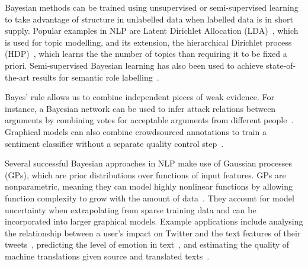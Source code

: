 Bayesian methods can be trained using unsupervised or semi-supervised learning
to take advantage of structure in unlabelled data when labelled data is in short supply.
Popular examples in NLP are
Latent Dirichlet Allocation (LDA)~\cite{blei2003latent}, which is used for topic modelling,
and its extension, the hierarchical Dirichlet process (HDP)~\cite{teh2005sharing}, which learns the 
the number of topics than requiring it to be fixed a priori.
Semi-supervised Bayesian learning
has also been used to achieve state-of-the-art results for semantic role labelling~\cite{titov2012bayesian}.

Bayes' rule allows us to combine independent pieces of weak evidence.
For instance, a Bayesian network can be used to infer attack relations between arguments by combining votes for acceptable arguments from different people~\cite{kido2017}.
Graphical models can also combine crowdsourced annotations to train a sentiment classifier
without a separate quality control step~\cite{simpson2015language,felt2016semantic}.

Several successful Bayesian approaches in NLP make use of Gaussian processes (GPs), which are 
prior distributions over functions of input features. 
GPs are nonparametric, meaning they can model highly nonlinear functions by
allowing function complexity to grow with the amount of data~\cite{rasmussen_gaussian_2006}.
They account for model uncertainty when extrapolating from sparse training data
and can be incorporated into larger graphical models.
Example applications include analysing the relationship between a user's impact on Twitter 
and the text features of their tweets~\cite{lampos2014predicting}, 
predicting the level of emotion in text~\cite{beck2014joint},
and estimating the quality of machine translations given source and translated texts~\cite{cohn2013modelling}.

